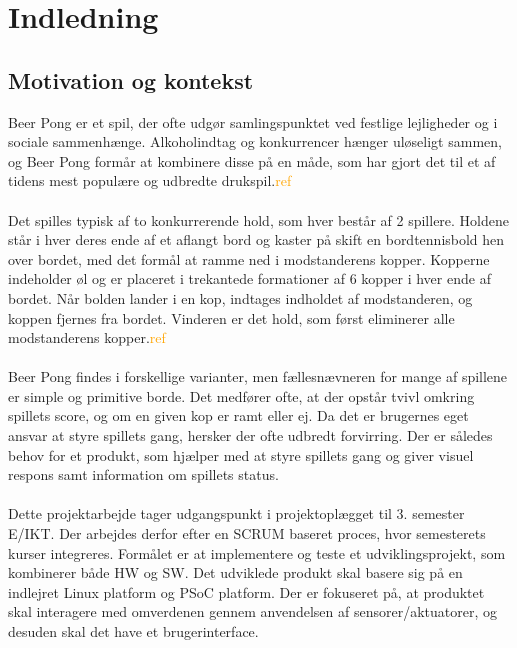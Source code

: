 \documentclass[Rapport/Rapport_main.tex]{subfiles}
\begin{document}
\section{Indledning}\label{sec:Indledning}
\subsection{Motivation og kontekst}
Beer Pong er et spil, der ofte udgør samlingspunktet ved festlige lejligheder og i sociale sammenhænge. Alkoholindtag og konkurrencer hænger uløseligt sammen, og Beer Pong formår at kombinere disse på en måde, som har gjort det til et af tidens mest populære og udbredte drukspil.\textcolor{orange}{ref} \\\\Det spilles typisk af to konkurrerende hold, som hver består af 2 spillere. Holdene står i hver deres ende af et aflangt bord og kaster på skift en bordtennisbold hen over bordet, med det formål at ramme ned i modstanderens kopper. Kopperne indeholder øl og er placeret i trekantede formationer af 6 kopper i hver ende af bordet. Når bolden lander i en kop, indtages indholdet af modstanderen, og koppen fjernes fra bordet. Vinderen er det hold, som først eliminerer alle modstanderens kopper.\textcolor{orange}{ref}
\\\\Beer Pong findes i forskellige varianter, men fællesnævneren for mange af spillene er simple og primitive borde. Det medfører ofte, at der opstår tvivl omkring spillets score, og om en given kop er ramt eller ej. Da det er brugernes eget ansvar at styre spillets gang, hersker der ofte udbredt forvirring. Der er således behov for et produkt, som hjælper med at styre spillets gang og giver visuel respons samt information om spillets status.
\\\\Dette projektarbejde tager udgangspunkt i projektoplægget til 3. semester E/IKT\cite{Universitet2018}. Der arbejdes derfor efter en SCRUM baseret proces, hvor semesterets kurser integreres. Formålet er at implementere og teste et udviklingsprojekt, som kombinerer både HW og SW. Det udviklede produkt skal basere sig på en indlejret Linux platform og PSoC platform. Der er fokuseret på, at produktet skal interagere med omverdenen gennem anvendelsen af sensorer/aktuatorer, og desuden skal det have et brugerinterface.\\\\
\end{document}
